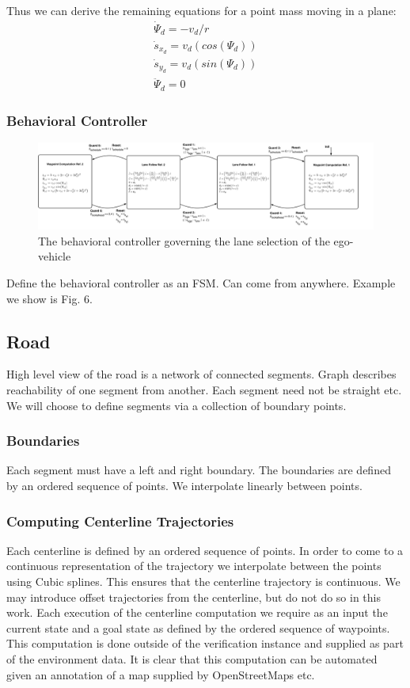 \documentclass{easychair}
\theoremstyle{theorem}
\theoremstyle{remark}
\begin{document}
\noindent Thus we can derive the remaining equations for a point mass moving in a plane:
\begin{gather}
 \dot{\Psi}_d= -v_d/r\\
 \dot{s}_{x_d} = v_d \left(cos(\Psi_d)\right)\\
 \dot{s}_{y_d} = v_d \left(sin(\Psi_d) \right)\\
 \ddot{\Psi}_d = 0
\end{gather}
\subsubsection{Behavioral Controller}

\begin{figure}[h]
	\centering
	\includegraphics[width=\textwidth]{figures/arch-ego-automaton}
	\caption{The behavioral controller governing the lane selection of the ego-vehicle}
\end{figure}
Define the behavioral controller as an FSM. Can come from anywhere. Example we show is Fig. 6.
\subsection{Road}
High level view of the road is a network of connected segments. Graph describes reachability of one segment from another. Each segment need not be straight etc. We will choose to define segments via a collection of boundary points. 
\subsubsection{Boundaries}
Each segment must have a left and right boundary. The boundaries are defined by an ordered sequence of points. We interpolate linearly between points. 
\subsubsection{Computing Centerline Trajectories}
Each centerline is defined by an ordered sequence of points. In order to come to a continuous representation of the trajectory we interpolate between the points using Cubic splines. This ensures that the centerline trajectory is continuous. We may introduce offset trajectories from the centerline, but do not do so in this work. 
Each execution of the centerline computation we require as an input the current state and a goal state as defined by the ordered sequence of waypoints. This computation is done outside of the verification instance and supplied as part of the environment data. It is clear that this computation can be automated given an annotation of a map supplied by OpenStreetMaps etc.
\end{document}

